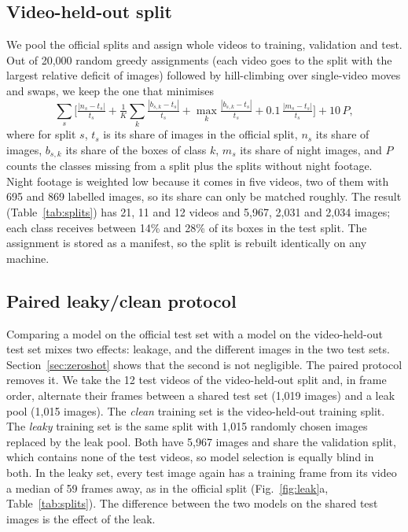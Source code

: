 \documentclass[conference]{IEEEtran}
\begin{document}
\subsection{Video-held-out split}
We pool the official splits and assign whole videos to training, validation and test. Out of 20,000 random
greedy assignments (each video goes to the split with the largest relative deficit of images) followed by
hill-climbing over single-video moves and swaps, we keep the one that minimises
\begin{equation}
\sum_{s} \Big[ \tfrac{|n_s - t_s|}{t_s}
  + \tfrac{1}{K}\sum_{k} \tfrac{|b_{s,k} - t_s|}{t_s}
  + \max_{k} \tfrac{|b_{s,k} - t_s|}{t_s}
  + 0.1\,\tfrac{|m_s - t_s|}{t_s} \Big] + 10\,P,
\end{equation}
where for split $s$, $t_s$ is its share of images in the official split, $n_s$ its share of images,
$b_{s,k}$ its share of the boxes of class $k$, $m_s$ its share of night images, and $P$ counts the classes
missing from a split plus the splits without night footage. Night footage is weighted low because it comes
in five videos, two of them with 695 and 869 labelled images, so its share can only be matched roughly. The result
(Table~\ref{tab:splits}) has 21, 11 and 12 videos and 5,967, 2,031 and 2,034 images; each class receives
between 14\% and 28\% of its boxes in the test split. The assignment is stored as a manifest, so the split
is rebuilt identically on any machine.

\subsection{Paired leaky/clean protocol}
Comparing a model on the official test set with a model on the video-held-out test set mixes two effects:
leakage, and the different images in the two test sets. Section~\ref{sec:zeroshot} shows that the second is
not negligible. The paired protocol removes it. We take the 12 test videos of the video-held-out split and, in frame
order, alternate their frames between a shared test set (1,019 images) and a leak pool (1,015 images). The
\emph{clean} training set is the video-held-out training split. The \emph{leaky} training set is the same
split with 1,015 randomly chosen images replaced by the leak pool. Both have 5,967 images and share the
validation split, which contains none of the test videos, so model selection is equally blind in both. In
the leaky set, every test image again has a training frame from its video a median of 59 frames away, as
in the official split (Fig.~\ref{fig:leak}a, Table~\ref{tab:splits}). The difference between the two
models on the shared test images is the effect of the leak.
\end{document}

